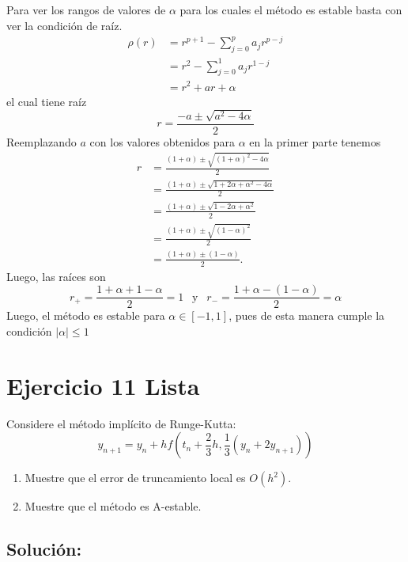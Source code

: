 \documentclass[12pt]{article}
\begin{document}
Para ver los rangos de valores de $\alpha$ para los cuales el método es estable basta con ver la condición de raíz.
\begin{align*}
\rho(r) & = r^{p+1} - \sum_{j=0}^p a_jr^{p-j} \\
& = r^2 - \sum_{j=0}^1 a_jr^{1-j} \\
& = r^2 + ar + \alpha
\end{align*}
el cual tiene raíz
\begin{equation*}
    r = \frac{-a\pm\sqrt{a^2 - 4\alpha}}{2}
\end{equation*}
Reemplazando $a$ con los valores obtenidos para $\alpha$ en la primer parte tenemos
\begin{align*}
r & = \frac{(1 + \alpha)\pm \sqrt{(1+\alpha)^2 - 4\alpha}}{2} \\
& = \frac{(1+\alpha)\pm \sqrt{1 + 2\alpha + \alpha^2 - 4\alpha}}{2} \\
& = \frac{(1+\alpha)\pm \sqrt{1 - 2\alpha + \alpha^2}}{2} \\
& = \frac{(1+\alpha)\pm \sqrt{(1-\alpha)^2}}{2} \\
& = \frac{(1+\alpha)\pm (1-\alpha)}{2}.
\end{align*}
Luego, las raíces son
\begin{equation*}
    r_+ = \frac{1+\alpha+1-\alpha}{2} = 1 \ \ \textrm{ y } \ \ r_- = \frac{1+\alpha-(1-\alpha)}{2} = \alpha
\end{equation*}
Luego, el método es estable para $\alpha \in [-1, 1]$, pues de esta manera cumple la condición $|\alpha| \leq 1$

\section{Ejercicio 11 Lista}

Considere el método implícito de Runge-Kutta:
\begin{equation*}
    y_{n+1} = y_n + hf\left(t_n + \frac{2}{3}h, \frac{1}{3}(y_n + 2y_{n+1})\right)
\end{equation*}

\begin{enumerate}[label=\alph*)]
    \item Muestre que el error de truncamiento local es $O(h^2)$.
    \item Muestre que el método es A-estable.
\end{enumerate}

\subsection{Solución:}
\end{document}
